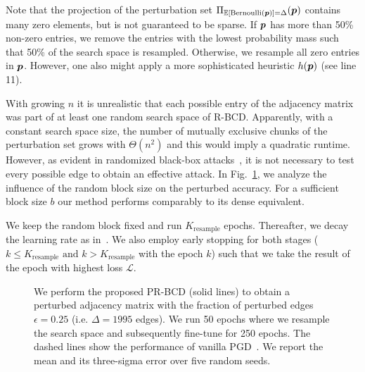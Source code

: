 \documentclass[sigconf,authordraft]{acmart}
\begin{document}
Note that the projection of the perturbation set \(\Pi_{\mathbb{E}[\text{Bernoulli}({\bm{p}})] = \Delta} ({\bm{p}})\) contains many zero elements, but is not guaranteed to be sparse. If \({\bm{p}}\) has more than 50\% non-zero entries, we remove the entries with the lowest probability mass such that 50\% of the search space is resampled. Otherwise, we resample all zero entries in \({\bm{p}}\). However, one also might apply a more sophisticated heuristic \(h({\bm{p}})\) (see line 11).

With growing \(n\) it is unrealistic that each possible entry of the adjacency matrix was part of at least one random search space of R-BCD. Apparently, with a constant search space size, the number of mutually exclusive chunks of the perturbation set grows with \(\Theta(n^2)\) and this would imply a quadratic runtime. However, as evident in randomized black-box attacks~\citep{Waniek2018}, it is not necessary to test every possible edge to obtain an effective attack. In Fig.~\ref{fig:randomblocksizeinfluence}, we analyze the influence of the random block size on the perturbed accuracy. For a sufficient block size \(b\) our method performs comparably to its dense equivalent.

We keep the random block fixed and run \(K_{\text{resample}}\) epochs. Thereafter, we decay the learning rate as in~\cite{Xu2019a}. We also employ early stopping for both stages (\(k \le K_{\text{resample}} \text{ and } k > K_{\text{resample}}\) with the epoch \(k\)) such that we take the result of the epoch with highest loss \(\mathcal{L}\).


\begin{figure}[t]
  \centering
  \vspace{-15pt} \resizebox{\linewidth}{!}{}
  \caption{We perform the proposed PR-BCD (solid lines) to obtain a perturbed adjacency matrix with the fraction of perturbed edges \(\epsilon=0.25\) (i.e. \(\Delta=1995\) edges). We run 50 epochs where we resample the search space and subsequently fine-tune for 250 epochs. The dashed lines show the performance of vanilla PGD~\citep{Xu2019a}. We report the mean and its three-sigma error over five random seeds. \label{fig:randomblocksizeinfluence}}
\end{figure}
\end{document}
